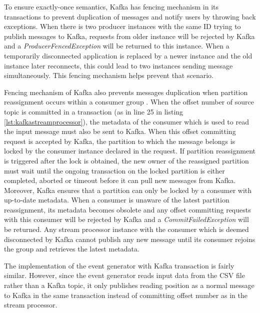  

To ensure exactly-once semantics, Kafka has fencing mechanism in its transactions to prevent duplication of messages and notify users by throwing back exceptions. When there is two producer instances with the same ID trying to publish messages to Kafka, requests from older instance will be rejected by Kafka and a \emph{ProducerFencedException} will be returned to this instance. When a temporarily disconnected application is replaced by a newer instance and the old instance later reconnects, this could lead to two instances sending message simultaneously. This fencing mechanism helps prevent that scenario. 

Fencing mechanism of Kafka also prevents messages duplication when partition reassignment occurs within a consumer group \cite{kafkatransctionscaleproducer}. When the offset number of source topic is committed in a transaction (as in line 25 in listing \ref{lst:kafkastreamprocessor}), the metadata of the consumer which is used to read the input message must also be sent to Kafka. When this offset committing request is accepted by Kafka, the partition to which the message belongs is locked by the consumer instance declared in the request. If partition reassignment is triggered after the lock is obtained, the new owner of the reassigned partition must wait until the ongoing transaction on the locked partition is either completed, aborted or timeout before it can pull new messages from Kafka. Moreover, Kafka ensures that a partition can only be locked by a consumer with up-to-date metadata. When a consumer is unaware of the latest partition reassignment, its metadata becomes obsolete and any offset committing requests with this consumer will be rejected by Kafka and a \emph{CommitFailedException} will be returned. Any stream processor instance with the consumer which is deemed disconnected by Kafka cannot publish any new message until its consumer rejoins the group and retrieves the latest metadata.

The implementation of the event generator with Kafka transaction is fairly similar. However, since the event generator reads input data from the CSV file rather than a Kafka topic, it only publishes reading position as a normal message to Kafka in the same transaction instead of committing offset number as in the stream processor.

